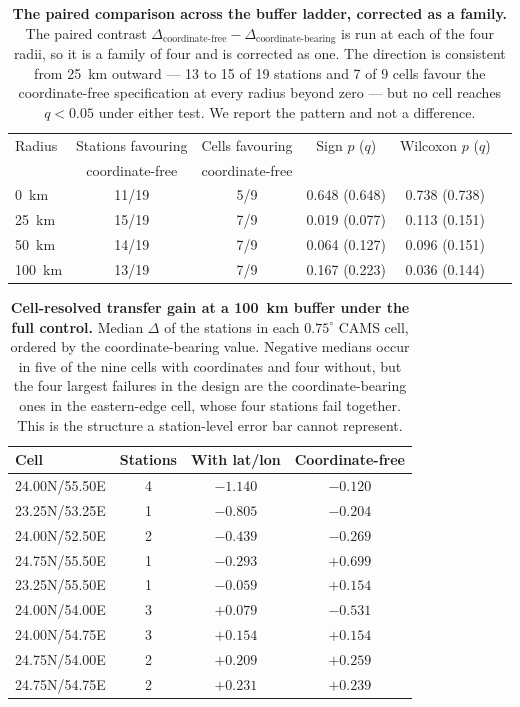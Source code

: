 \documentclass[11pt]{article}
\begin{document}
\begin{table}[htbp]\centering\footnotesize
\caption{\textbf{The paired comparison across the buffer ladder, corrected as a family.} The paired contrast $\Delta_{\text{coordinate-free}}-\Delta_{\text{coordinate-bearing}}$ is run at each of the four radii, so it is a family of four and is corrected as one. The direction is consistent from 25~km outward --- 13 to 15 of 19 stations and 7 of 9 cells favour the coordinate-free specification at every radius beyond zero --- but no cell reaches $q<0.05$ under either test. We report the pattern and not a difference.}
\label{si:t30}
\begin{tabular}{lccccc}\toprule
Radius & Stations favouring & Cells favouring & Sign $p$ ($q$) & Wilcoxon $p$ ($q$) \\
 & coordinate-free & coordinate-free & & \\ \midrule
0~km & 11/19 & 5/9 & 0.648 (0.648) & 0.738 (0.738) \\
25~km & 15/19 & 7/9 & 0.019 (0.077) & 0.113 (0.151) \\
50~km & 14/19 & 7/9 & 0.064 (0.127) & 0.096 (0.151) \\
100~km & 13/19 & 7/9 & 0.167 (0.223) & 0.036 (0.144) \\
\bottomrule\end{tabular}\end{table}

\begin{table}[htbp]\centering\footnotesize
\caption{\textbf{Cell-resolved transfer gain at a 100~km buffer under the full control.} Median $\Delta$ of the stations in each $0.75^\circ$ CAMS cell, ordered by the coordinate-bearing value. Negative medians occur in five of the nine cells with coordinates and four without, but the four largest failures in the design are the coordinate-bearing ones in the eastern-edge cell, whose four stations fail together. This is the structure a station-level error bar cannot represent.}
\label{si:t31}
\begin{tabular}{lccc}\toprule
Cell & Stations & With lat/lon & Coordinate-free \\ \midrule
24.00N/55.50E & 4 & $-1.140$ & $-0.120$ \\
23.25N/53.25E & 1 & $-0.805$ & $-0.204$ \\
24.00N/52.50E & 2 & $-0.439$ & $-0.269$ \\
24.75N/55.50E & 1 & $-0.293$ & $+0.699$ \\
23.25N/55.50E & 1 & $-0.059$ & $+0.154$ \\
24.00N/54.00E & 3 & $+0.079$ & $-0.531$ \\
24.00N/54.75E & 3 & $+0.154$ & $+0.154$ \\
24.75N/54.00E & 2 & $+0.209$ & $+0.259$ \\
24.75N/54.75E & 2 & $+0.231$ & $+0.239$ \\
\bottomrule\end{tabular}\end{table}
\end{document}

